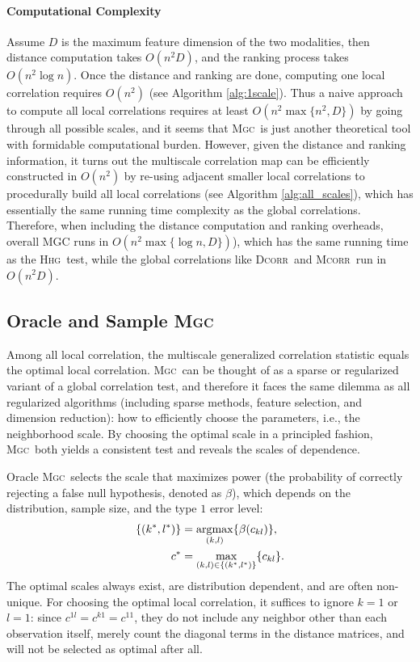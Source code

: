 \documentclass[11pt]{article}
\providecommand{\sct}[1]{{\normalfont\textsc{#1}}}
\newcommand{\GG}{c}
\newcommand{\Mgc}{\sct{Mgc}}
\newcommand{\Hhg}{\sct{Hhg}}
\newcommand{\Dcorr}{\sct{Dcorr}}
\newcommand{\Mcorr}{\sct{Mcorr}}
\newcommand{\argmax}{\operatornamewithlimits{argmax}}
\begin{document}
\paragraph{Computational Complexity}

Assume $D$ is the maximum feature dimension of the two modalities, then distance computation takes $O(n^2 D)$, and the ranking process takes $O(n^2 \log n)$. Once the distance and ranking are done, computing one local correlation requires $O(n^2)$ (see Algorithm \ref{alg:1scale}). Thus a naive approach to compute all local correlations requires at least $O(n^2 \max\{n^2, D\})$ by going through all possible scales, and it seems that \Mgc~is just another theoretical tool with formidable computational burden. However, given the distance and ranking information, it turns out the multiscale correlation map can be efficiently constructed in $O(n^2)$ by re-using adjacent smaller local correlations to procedurally build all local correlations (see Algorithm \ref{alg:all_scales}), which has essentially the same running time complexity as the global correlations. Therefore, when including the distance computation and ranking overheads, overall MGC runs in $O(n^2 \max\{\log n,D\})$), which has the same running time as the \Hhg~test, while the global correlations like \Dcorr~and \Mcorr~run in $O(n^2D)$.

\subsection{Oracle and Sample \Mgc}
\label{appen:mgc2}
Among all local correlation, the multiscale generalized correlation statistic equals the optimal local correlation. \Mgc~can be thought of as a sparse or regularized variant of a global correlation test, and therefore it faces the same dilemma as all regularized algorithms (including sparse methods, feature selection, and dimension reduction): how to efficiently choose the parameters, i.e., the neighborhood scale. By choosing the optimal scale in a principled fashion, \Mgc~both yields a consistent test and reveals the scales of dependence.  

Oracle \Mgc~selects the scale that maximizes power (the probability of correctly rejecting a false null hypothesis, denoted as $\beta$), which depends on the distribution, sample size, and the type $1$ error level:
\begin{align*}
\{(k^{*},l^{*})\} &=\argmax_{(k,l)}\{\beta(\GG_{kl})\}, \\
\GG^{*} &=\max_{(k,l) \in \{(k^{*},l^{*})\}} \{\GG_{kl}\}. 
\end{align*}
The optimal scales always exist,  are distribution dependent, and are often non-unique. For choosing the optimal local correlation, it suffices to ignore $k=1$ or $l=1$: since $\GG^{1l}=\GG^{k1}=\GG^{11}$, they do not include any neighbor other than each observation itself, merely count the diagonal terms in the distance matrices, and will not be selected as optimal after all.
\end{document}

